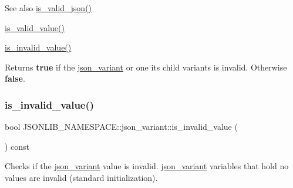 \begin{DoxySeeAlso}{See also}
\hyperlink{classJSONLIB__NAMESPACE_1_1json__variant_a158e3148d9256af3d1b8251b2ca7b6c4}{is\+\_\+valid\+\_\+json()} 

\hyperlink{classJSONLIB__NAMESPACE_1_1json__variant_a224aab2dd56e3928dd893be8b7f3367a}{is\+\_\+valid\+\_\+value()} 

\hyperlink{classJSONLIB__NAMESPACE_1_1json__variant_ab6552a5e3de90ab1fbca078e5c245bfb}{is\+\_\+invalid\+\_\+value()} 
\end{DoxySeeAlso}
\begin{DoxyReturn}{Returns}
{\bfseries true} if the \hyperlink{classJSONLIB__NAMESPACE_1_1json__variant}{json\+\_\+variant} or one it\textquotesingle{}s child variants is invalid. Otherwise {\bfseries false}. 
\end{DoxyReturn}
\mbox{\label{classJSONLIB__NAMESPACE_1_1json__variant_ab6552a5e3de90ab1fbca078e5c245bfb}} 
\subsubsection{\texorpdfstring{is\+\_\+invalid\+\_\+value()}{is\_invalid\_value()}\hspace{0.1cm}{\footnotesize\ttfamily [1/2]}}
{\footnotesize\ttfamily bool J\+S\+O\+N\+L\+I\+B\+\_\+\+N\+A\+M\+E\+S\+P\+A\+C\+E\+::json\+\_\+variant\+::is\+\_\+invalid\+\_\+value (\begin{DoxyParamCaption}{ }\end{DoxyParamCaption}) const}



Checks if the \hyperlink{classJSONLIB__NAMESPACE_1_1json__variant}{json\+\_\+variant} value is invalid. \hyperlink{classJSONLIB__NAMESPACE_1_1json__variant}{json\+\_\+variant} variables that hold no values are invalid (standard initialization). 

